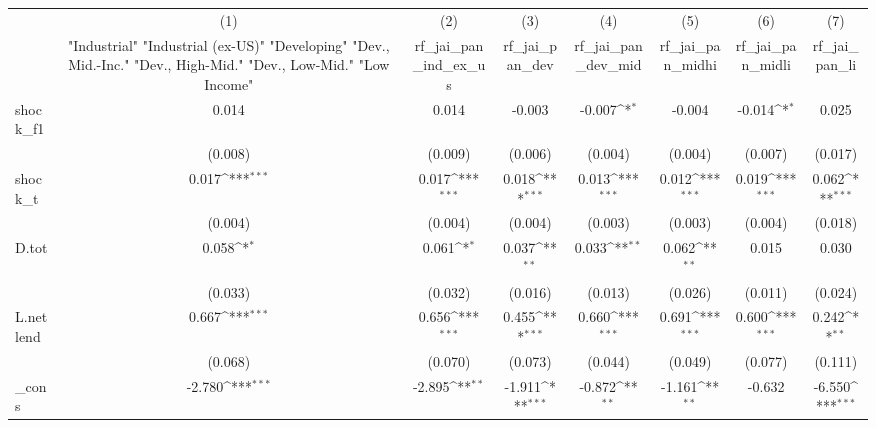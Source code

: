 {
\def\sym#1{\ifmmode^{#1}\else\(^{#1}\)\fi}
\begin{tabular}{l*{7}{c}}
\toprule
            &\multicolumn{1}{c}{(1)}&\multicolumn{1}{c}{(2)}&\multicolumn{1}{c}{(3)}&\multicolumn{1}{c}{(4)}&\multicolumn{1}{c}{(5)}&\multicolumn{1}{c}{(6)}&\multicolumn{1}{c}{(7)}\\
            &\multicolumn{1}{c}{ "Industrial" "Industrial (ex-US)" "Developing" "Dev., Mid.-Inc." "Dev., High-Mid."  "Dev., Low-Mid." "Low Income" }&\multicolumn{1}{c}{rf\_jai\_pan\_ind\_ex\_us}&\multicolumn{1}{c}{rf\_jai\_pan\_dev}&\multicolumn{1}{c}{rf\_jai\_pan\_dev\_mid}&\multicolumn{1}{c}{rf\_jai\_pan\_midhi}&\multicolumn{1}{c}{rf\_jai\_pan\_midli}&\multicolumn{1}{c}{rf\_jai\_pan\_li}\\
\midrule
shock\_f1    &       0.014         &       0.014         &      -0.003         &      -0.007\sym{*}  &      -0.004         &      -0.014\sym{*}  &       0.025         \\
            &     (0.008)         &     (0.009)         &     (0.006)         &     (0.004)         &     (0.004)         &     (0.007)         &     (0.017)         \\
\addlinespace
shock\_t     &       0.017\sym{***}&       0.017\sym{***}&       0.018\sym{***}&       0.013\sym{***}&       0.012\sym{***}&       0.019\sym{***}&       0.062\sym{***}\\
            &     (0.004)         &     (0.004)         &     (0.004)         &     (0.003)         &     (0.003)         &     (0.004)         &     (0.018)         \\
\addlinespace
D.tot       &       0.058\sym{*}  &       0.061\sym{*}  &       0.037\sym{**} &       0.033\sym{**} &       0.062\sym{**} &       0.015         &       0.030         \\
            &     (0.033)         &     (0.032)         &     (0.016)         &     (0.013)         &     (0.026)         &     (0.011)         &     (0.024)         \\
\addlinespace
L.netlend   &       0.667\sym{***}&       0.656\sym{***}&       0.455\sym{***}&       0.660\sym{***}&       0.691\sym{***}&       0.600\sym{***}&       0.242\sym{**} \\
            &     (0.068)         &     (0.070)         &     (0.073)         &     (0.044)         &     (0.049)         &     (0.077)         &     (0.111)         \\
\addlinespace
\_cons      &      -2.780\sym{***}&      -2.895\sym{**} &      -1.911\sym{***}&      -0.872\sym{**} &      -1.161\sym{**} &      -0.632         &      -6.550\sym{***}\\

\end{tabular}}
